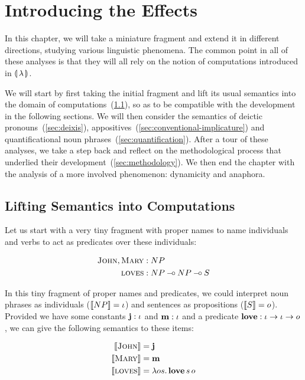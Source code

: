 \chapter{Introducing the Effects}

\setcounter{exx}{0}

In this chapter, we will take a miniature fragment and extend it in
different directions, studying various linguistic phenomena. The common
point in all of these analyses is that they will all rely on the notion of
computations introduced in $\llparenthesis \, \lambda \, \rrparenthesis$.

We will start by first taking the initial fragment and lift its usual
semantics into the domain of computations~(\ref{sec:lifting-semantics}), so
as to be compatible with the development in the following sections. We will
then consider the semantics of deictic pronouns~(\ref{sec:deixis}),
appositives~(\ref{sec:conventional-implicature}) and quantificational noun
phrases~(\ref{sec:quantification}). After a tour of these analyses, we take
a step back and reflect on the methodological process that underlied their
development~(\ref{sec:methodology}). We then end the chapter with the
analysis of a more involved phenomenon: dynamicity and anaphora.

\minitoc


\section{Lifting Semantics into Computations}
\label{sec:lifting-semantics}

Let us start with a very tiny fragment with proper names to name
individuals and verbs to act as predicates over these individuals:

\begin{align*}
  \textsc{John}, \textsc{Mary} &: NP \\
  \textsc{loves} &: NP \mathbin{{-}\mkern-3.5mu{\circ}} NP \mathbin{{-}\mkern-3.5mu{\circ}} S
\end{align*}

In this tiny fragment of proper names and predicates, we could interpret
noun phrases as individuals ($\llbracket NP \rrbracket = \iota$) and sentences as
propositions ($\llbracket S \rrbracket = o$). Provided we have some constants
$\textbf{j} : \iota$ and $\textbf{m} : \iota$ and a predicate
$\textbf{love} : \iota \to \iota \to o$, we can give the following semantics
to these items:

\begin{align*}
  \llbracket \textsc{John} \rrbracket &= \textbf{j} \\
  \llbracket \textsc{Mary} \rrbracket &= \textbf{m} \\
  \llbracket \textsc{loves} \rrbracket &= \lambda o s.\, \textbf{love}\,s\,o
\end{align*}

